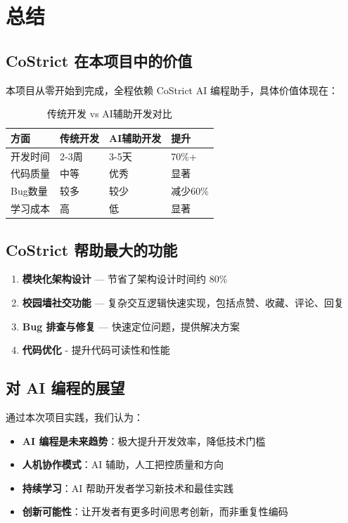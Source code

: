 ﻿\documentclass[12pt,a4paper]{article}
\begin{document}
\section{总结}

\subsection{CoStrict 在本项目中的价值}

本项目从零开始到完成，全程依赖 CoStrict AI 编程助手，具体价值体现在：

\begin{table}[h]
\centering
\begin{tabular}{|l|l|l|l|}
\hline
\textbf{方面} & \textbf{传统开发} & \textbf{AI辅助开发} & \textbf{提升} \\
\hline
开发时间 & 2-3周 & 3-5天 & 70\%+ \\
\hline
代码质量 & 中等 & 优秀 & 显著 \\
\hline
Bug数量 & 较多 & 较少 & 减少60\% \\
\hline
学习成本 & 高 & 低 & 显著 \\
\hline
\end{tabular}
\caption{传统开发 vs AI辅助开发对比}
\end{table}

\subsection{CoStrict 帮助最大的功能}

\begin{enumerate}
    \item \textbf{模块化架构设计} — 节省了架构设计时间约 80\%
    \item \textbf{校园墙社交功能} — 复杂交互逻辑快速实现，包括点赞、收藏、评论、回复
    \item \textbf{Bug 排查与修复} — 快速定位问题，提供解决方案
    \item \textbf{代码优化} - 提升代码可读性和性能
\end{enumerate}

\subsection{对 AI 编程的展望}

通过本次项目实践，我们认为：

\begin{itemize}
    \item \textbf{AI 编程是未来趋势}：极大提升开发效率，降低技术门槛
    \item \textbf{人机协作模式}：AI 辅助，人工把控质量和方向
    \item \textbf{持续学习}：AI 帮助开发者学习新技术和最佳实践
    \item \textbf{创新可能性}：让开发者有更多时间思考创新，而非重复性编码
\end{itemize}
\end{document}
